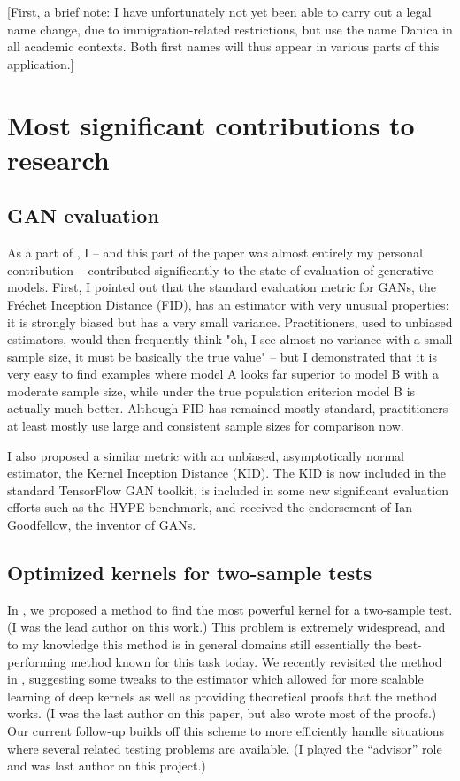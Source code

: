 \documentclass[12pt]{article}
\begin{document}
[First, a brief note: I have unfortunately not yet been able to carry out a legal name change, due to immigration-related restrictions, but use the name Danica in all academic contexts. Both first names will thus appear in various parts of this application.]


\section{Most significant contributions to research}

\subsection{GAN evaluation}

As a part of \cite{binkowski:mmd-gans}, I – and this part of the paper was almost entirely my personal contribution – contributed significantly to the state of evaluation of generative models. First, I pointed out that the standard evaluation metric for GANs, the Fréchet Inception Distance (FID), has an estimator with very unusual properties: it is strongly biased but has a very small variance. Practitioners, used to unbiased estimators, would then frequently think "oh, I see almost no variance with a small sample size, it must be basically the true value" – but I demonstrated that it is very easy to find examples where model A looks far superior to model B with a moderate sample size, while under the true population criterion model B is actually much better. Although FID has remained mostly standard, practitioners at least mostly use large and consistent sample sizes for comparison now.

I also proposed a similar metric with an unbiased, asymptotically normal estimator, the Kernel Inception Distance (KID). The KID is now included in the standard TensorFlow GAN toolkit, is included in some new significant evaluation efforts such as the HYPE benchmark, and received the endorsement of Ian Goodfellow, the inventor of GANs.



\subsection{Optimized kernels for two-sample tests}

In \cite{sutherland:opt-mmd}, we proposed a method to find the most powerful kernel for a two-sample test. (I was the lead author on this work.) This problem is extremely widespread, and to my knowledge this method is in general domains still essentially the best-performing method known for this task today. We recently revisited the method in \cite{liu:deep-testing}, suggesting some tweaks to the estimator which allowed for more scalable learning of deep kernels as well as providing theoretical proofs that the method works. (I was the last author on this paper, but also wrote most of the proofs.) Our current follow-up \cite{liu:meta-2st} builds off this scheme to more efficiently handle situations where several related testing problems are available. (I played the ``advisor'' role and was last author on this project.)
\end{document}

